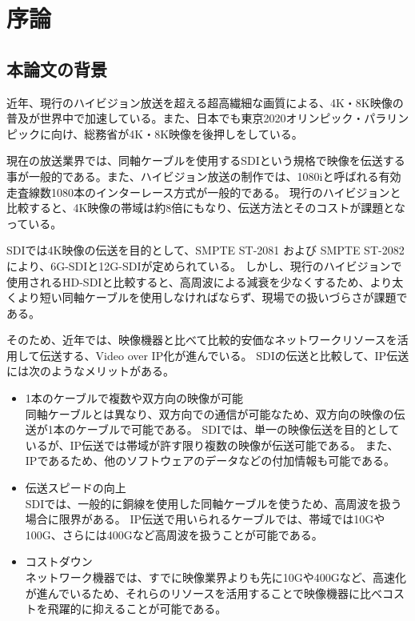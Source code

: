 \chapter{序論}
\label{chap:introduction}

\section{本論文の背景}
近年、現行のハイビジョン放送を超える超高繊細な画質による、4K・8K映像の普及が世界中で加速している。また、日本でも東京2020オリンピック・パラリンピックに向け、総務省が4K・8K映像を後押しをしている。

現在の放送業界では、同軸ケーブルを使用するSDIという規格で映像を伝送する事が一般的である。また、ハイビジョン放送の制作では、1080iと呼ばれる有効走査線数1080本のインターレース方式が一般的である。
現行のハイビジョンと比較すると、4K映像の帯域は約8倍にもなり、伝送方法とそのコストが課題となっている。

SDIでは4K映像の伝送を目的として、SMPTE ST-2081 および SMPTE ST-2082により、6G-SDIと12G-SDIが定められている。
しかし、現行のハイビジョンで使用されるHD-SDIと比較すると、高周波による減衰を少なくするため、より太くより短い同軸ケーブルを使用しなければならず、現場での扱いづらさが課題である。

そのため、近年では、映像機器と比べて比較的安価なネットワークリソースを活用して伝送する、Video over IP化が進んでいる。
SDIの伝送と比較して、IP伝送には次のようなメリットがある。

\begin{itemize}
  \item 1本のケーブルで複数や双方向の映像が可能\mbox{}\\
    同軸ケーブルとは異なり、双方向での通信が可能なため、双方向の映像の伝送が1本のケーブルで可能である。
    SDIでは、単一の映像伝送を目的としているが、IP伝送では帯域が許す限り複数の映像が伝送可能である。
    また、IPであるため、他のソフトウェアのデータなどの付加情報も可能である。
  \item 伝送スピードの向上\mbox{}\\
    SDIでは、一般的に銅線を使用した同軸ケーブルを使うため、高周波を扱う場合に限界がある。
    IP伝送で用いられるケーブルでは、帯域では10Gや100G、さらには400Gなど高周波を扱うことが可能である。
  \item コストダウン\mbox{}\\
    ネットワーク機器では、すでに映像業界よりも先に10Gや400Gなど、高速化が進んでいるため、それらのリソースを活用することで映像機器に比べコストを飛躍的に抑えることが可能である。
\end{itemize}

